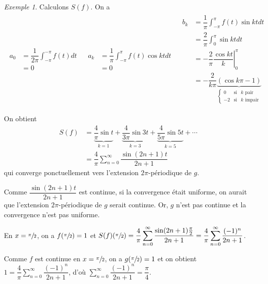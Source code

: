 \documentclass{report}
\newcommand*{\dsum}[4]{\displaystyle\sum_{#1=#2}^{#3}#4}
\newcommand*{\dint}[3]{\displaystyle\int_{#1}^{#2}#3}
\theoremstyle{definition}
\theoremstyle{remark}
\newtheorem*{exem}{Exemple}
\begin{document}
\begin{exem}
		Calculons $S(f)$. On a
		\begin{align*}
			\begin{split}
				a_0&= \dfrac{1}{2\pi} \dint{-\pi}{-\pi}{f(t) dt}\\
				&= 0
			\end{split}
			&
			\begin{split}
				a_k&= \dfrac{1}{\pi} \dint{-\pi}{\pi}{f(t) \cos kt dt}\\
				&= 0
			\end{split}
			&
			\begin{split}
				b_k&= \dfrac{1}{\pi} \dint{-\pi}{\pi}{f(t) \sin kt dt}\\
				&= \dfrac{2}{\pi} \dint{0}{\pi}{\sin kt dt}\\
				&= -\dfrac{2}{\pi} \left.\dfrac{\cos kt}{k}\right|_0^\pi\\
				&= -\dfrac{2}{k\pi}\underbrace{\left(\cos k\pi-1\right)}_{\left\lbrace \begin{array}{rcl}
						0&\text{si}&k\text{ pair}\\
						-2&\text{si}&k\text{ impair}
				\end{array} \right.}
			\end{split}
		\end{align*}

		On obtient
		\begin{align*}
			S(f)&= \underbrace{\dfrac{4}{\pi} \sin t}_{k=1} + \underbrace{\dfrac{4}{3\pi} \sin 3t}_{k=3} + \underbrace{\dfrac{4}{5\pi} \sin 5t}_{k=5} + \dotsb\\
			&= \dfrac{4}{\pi} \dsum{n}{0}{\infty}{\dfrac{\sin(2n+1)t}{2n+1}}
		\end{align*}
		qui converge ponctuellement vers l'extension $2\pi$-p\'eriodique de $g$.

		Comme $\dfrac{\sin(2n+1)t}{2n+1}$ est continue, si la convergence \'etait uniforme, on aurait que l'extension $2\pi$-p\'eriodique de $g$ serait continue. Or, $g$ n'est pas continue et la convergence n'est pas uniforme.

		En $x=\sfrac{\pi}{2}$, on a $f(\sfrac{\pi}{2}) = 1$ et $S(f)(\sfrac{\pi}{2}) = \dfrac{4}{\pi} \dsum{n}{0}{\infty}{\dfrac{\sin(2n+1)\frac{\pi}{2}}{2n+1}} = \dfrac{4}{\pi} \dsum{n}{0}{\infty}{\dfrac{(-1)^n}{2n+1}}$.

		Comme $f$ est continue en $x=\sfrac{\pi}{2}$, on a $g(\sfrac{\pi}{2})=1$ et on obtient $1 = \dfrac{4}{\pi} \dsum{n}{0}{\infty}{\dfrac{(-1)^n}{2n+1}}$, d'o\`u $\dsum{n}{0}{\infty}{\dfrac{(-1)^n}{2n+1}} = \dfrac{\pi}{4}$.
	\end{exem}
\end{document}
